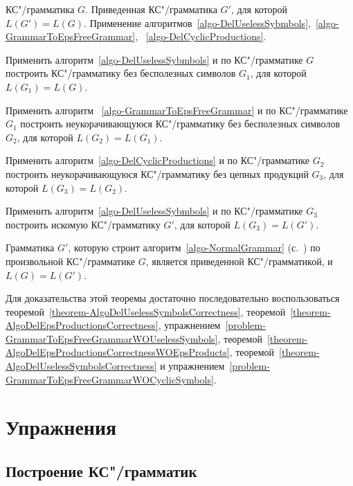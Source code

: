 {\label{algo-NormalGrammar}КС"/грамматика $G$.}
{Приведенная КС"/грамматика $G'$, для которой $L(G')=L(G)$.}
{Применение алгоритмов~\ref{algo-DelUselessSybmbols},~\ref{algo-GrammarToEpsFreeGrammar}, ~\ref{algo-DelCyclicProductions}.}
{
\item Применить алгоритм~\ref{algo-DelUselessSybmbols} и по КС"/грамматике $G$ построить КС"/грамматику без бесполезных символов $G_1$, для которой $L(G_1)=L(G)$.

\item Применить алгоритм ~\ref{algo-GrammarToEpsFreeGrammar} и по КС"/грамматике $G_1$ построить неукорачивающуюся КС"/грамматику без бесполезных символов $G_2$, для которой $L(G_2)=L(G_1)$.

\item Применить алгоритм~\ref{algo-DelCyclicProductions} и по КС"/грамматике $G_2$ построить неукорачивающуюся КС"/грамматику без цепных продукций $G_3$, для которой $L(G_3)=L(G_2)$.

\item Применить алгоритм~\ref{algo-DelUselessSybmbols} и по КС"/грамматике $G_3$ построить искомую КС"/грамматику $G'$, для которой $L(G_3)=L(G')$.
}

\begin{mytheorem}
\label{theorem-NormalGrammarAlgoCorrectness}
Грамматика $G'$, которую строит алгоритм~\ref{algo-NormalGrammar} (с.~\pageref{algo-NormalGrammar}) по произвольной КС"/грамматике $G$, является приведенной КС"/грамматикой, и $L(G)=L(G')$.
\end{mytheorem}

\begin{myproof}
Для доказательства этой теоремы достаточно последовательно воспользоваться теоремой~\ref{theorem-AlgoDelUselessSymbolsCorrectness}, теоремой~\ref{theorem-AlgoDelEpsProductionsCorrectness}, упражнением~\ref{problem-GrammarToEpsFreeGrammarWOUselessSymbols}, теоремой~\ref{theorem-AlgoDelEpsProductionsCorrectnessWOEpsProducts}, теоремой~\ref{theorem-AlgoDelUselessSymbolsCorrectness} и упражнением~\ref{problem-GrammarToEpsFreeGrammarWOCyclicSymbols}.
\end{myproof}

\section{Упражнения}
\label{Chapter6Exs}
\subsection*{Построение КС"/грамматик}

